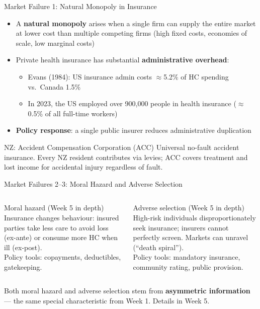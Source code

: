 \documentclass[aspectratio=169, 12pt]{beamer}
\begin{document}
\begin{frame}{Market Failure 1: Natural Monopoly in Insurance}
  \small
  \begin{itemize}
    \item A \textbf{natural monopoly} arises when a single firm can supply the entire market at
          lower cost than multiple competing firms (high fixed costs, economies of scale,
          low marginal costs)
    \item Private health insurance has substantial \textbf{administrative overhead}:
    \begin{itemize}
      \item Evans (1984): US insurance admin costs $\approx$5.2\% of HC spending vs.\ Canada 1.5\%
      \item In 2023, the US employed over 900,000 people in health insurance ($\approx$0.5\%
            of all full-time workers)
    \end{itemize}
    \item \textbf{Policy response}: a single public insurer reduces administrative duplication
  \end{itemize}
  \begin{exampleblock}{NZ: Accident Compensation Corporation (ACC)}
    \small Universal no-fault accident insurance. Every NZ resident contributes via levies; ACC
    covers treatment and lost income for accidental injury regardless of fault.
  \end{exampleblock}
\end{frame}

\begin{frame}{Market Failures 2--3: Moral Hazard and Adverse Selection}
  \begin{columns}
      \begin{block}{Moral hazard (Week 5 in depth)}
        Insurance changes behaviour: insured parties take less care to avoid loss (ex-ante)
        or consume more HC when ill (ex-post).\\[0.3em]
        Policy tools: copayments, deductibles, gatekeeping.
      \end{block}
      \begin{alertblock}{Adverse selection (Week 5 in depth)}
        High-risk individuals disproportionately seek insurance; insurers cannot perfectly
        screen. Markets can unravel (``death spiral'').\\[0.3em]
        Policy tools: mandatory insurance, community rating, public provision.
      \end{alertblock}
  \end{columns}
  \vspace{0.5em}
  Both moral hazard and adverse selection stem from \textbf{asymmetric information} ---
  the same special characteristic from Week 1. Details in Week 5.
\end{frame}
\end{document}
